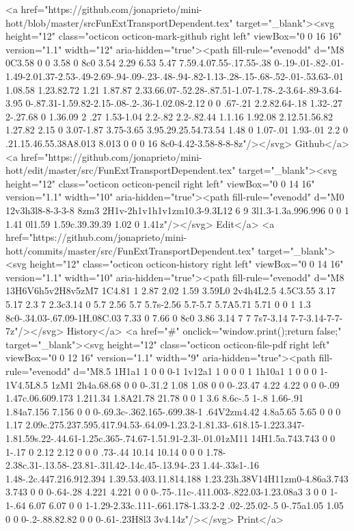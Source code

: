       <a href="https://github.com/jonaprieto/mini-hott/blob/master/srcFunExtTransportDependent.tex" target="_blank"><svg height="12" class="octicon octicon-mark-github right left" viewBox="0 0 16 16" version="1.1" width="12" aria-hidden="true"><path fill-rule="evenodd" d="M8 0C3.58 0 0 3.58 0 8c0 3.54 2.29 6.53 5.47 7.59.4.07.55-.17.55-.38 0-.19-.01-.82-.01-1.49-2.01.37-2.53-.49-2.69-.94-.09-.23-.48-.94-.82-1.13-.28-.15-.68-.52-.01-.53.63-.01 1.08.58 1.23.82.72 1.21 1.87.87 2.33.66.07-.52.28-.87.51-1.07-1.78-.2-3.64-.89-3.64-3.95 0-.87.31-1.59.82-2.15-.08-.2-.36-1.02.08-2.12 0 0 .67-.21 2.2.82.64-.18 1.32-.27 2-.27.68 0 1.36.09 2 .27 1.53-1.04 2.2-.82 2.2-.82.44 1.1.16 1.92.08 2.12.51.56.82 1.27.82 2.15 0 3.07-1.87 3.75-3.65 3.95.29.25.54.73.54 1.48 0 1.07-.01 1.93-.01 2.2 0 .21.15.46.55.38A8.013 8.013 0 0 0 16 8c0-4.42-3.58-8-8-8z"/></svg> Github</a>
      <a href="https://github.com/jonaprieto/mini-hott/edit/master/src/FunExtTransportDependent.tex" target="_blank"><svg height="12" class="octicon octicon-pencil right left" viewBox="0 0 14 16" version="1.1" width="10" aria-hidden="true"><path fill-rule="evenodd" d="M0 12v3h3l8-8-3-3-8 8zm3 2H1v-2h1v1h1v1zm10.3-9.3L12 6 9 3l1.3-1.3a.996.996 0 0 1 1.41 0l1.59 1.59c.39.39.39 1.02 0 1.41z"/></svg> Edit</a>
      <a href="https://github.com/jonaprieto/mini-hott/commits/master/src/FunExtTransportDependent.tex" target="_blank"><svg height="12" class="octicon octicon-history right left" viewBox="0 0 14 16" version="1.1" width="10" aria-hidden="true"><path fill-rule="evenodd" d="M8 13H6V6h5v2H8v5zM7 1C4.81 1 2.87 2.02 1.59 3.59L0 2v4h4L2.5 4.5C3.55 3.17 5.17 2.3 7 2.3c3.14 0 5.7 2.56 5.7 5.7s-2.56 5.7-5.7 5.7A5.71 5.71 0 0 1 1.3 8c0-.34.03-.67.09-1H.08C.03 7.33 0 7.66 0 8c0 3.86 3.14 7 7 7s7-3.14 7-7-3.14-7-7-7z"/></svg> History</a>
      <a  href="#" onclick="window.print();return false;" target="_blank"><svg height="12" class="octicon octicon-file-pdf right left" viewBox="0 0 12 16" version="1.1" width="9" aria-hidden="true"><path fill-rule="evenodd" d="M8.5 1H1a1 1 0 0 0-1 1v12a1 1 0 0 0 1 1h10a1 1 0 0 0 1-1V4.5L8.5 1zM1 2h4a.68.68 0 0 0-.31.2 1.08 1.08 0 0 0-.23.47 4.22 4.22 0 0 0-.09 1.47c.06.609.173 1.211.34 1.8A21.78 21.78 0 0 1 3.6 8.6c-.5 1-.8 1.66-.91 1.84a7.156 7.156 0 0 0-.69.3c-.362.165-.699.38-1 .64V2zm4.42 4.8a5.65 5.65 0 0 0 1.17 2.09c.275.237.595.417.94.53-.64.09-1.23.2-1.81.33-.618.15-1.223.347-1.81.59s.22-.44.61-1.25c.365-.74.67-1.51.91-2.3l-.01.01zM11 14H1.5a.743.743 0 0 1-.17 0 2.12 2.12 0 0 0 .73-.44 10.14 10.14 0 0 0 1.78-2.38c.31-.13.58-.23.81-.31l.42-.14c.45-.13.94-.23 1.44-.33s1-.16 1.48-.2c.447.216.912.394 1.39.53.403.11.814.188 1.23.23h.38V14H11zm0-4.86a3.743 3.743 0 0 0-.64-.28 4.221 4.221 0 0 0-.75-.11c-.411.003-.822.03-1.23.08a3 3 0 0 1-1-.64 6.07 6.07 0 0 1-1.29-2.33c.111-.661.178-1.33.2-2 .02-.25.02-.5 0-.75a1.05 1.05 0 0 0-.2-.88.82.82 0 0 0-.61-.23H8l3 3v4.14z"/></svg> Print</a>
